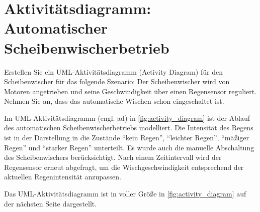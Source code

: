 \documentclass[
%
ngerman %
%
numeric %
]{wbh-assignment}
\begin{document}
\section{Aktivitätsdiagramm: Automatischer Scheibenwischerbetrieb}

\begin{aufgabenstellung}
Erstellen Sie ein UML-Aktivitätsdiagramm (Activity Diagram) für den Scheibenwischer für das folgende Szenario:
Der Scheibenwischer wird von Motoren angetrieben und seine Geschwindigkeit über einen Regensensor reguliert. Nehmen Sie an, dass das automatische Wischen schon eingeschaltet ist.
\end{aufgabenstellung}

\vspace*{5mm}

Im UML-Aktivitätsdiagramm (engl. \ac{ad}) in \autoref{fig:activity_diagram} ist der Ablauf des automatischen Scheibenwischerbetriebs modelliert.
Die Intensität des Regens ist in der Darstellung in die Zustände \enquote{kein Regen}, \enquote{leichter Regen}, \enquote{mäßiger Regen} und \enquote{starker Regen} unterteilt.
Es wurde auch die manuelle Abschaltung des Scheibenwischers berücksichtigt.
Nach einem Zeitintervall wird der Regensensor erneut abgefragt, um die Wischgeschwindigkeit entsprechend der aktuellen Regenintensität anzupassen.

Das UML-Aktivitätsdiagramm ist in voller Größe in \autoref{fig:activity_diagram} auf der nächsten Seite dargestellt.
\end{document}
